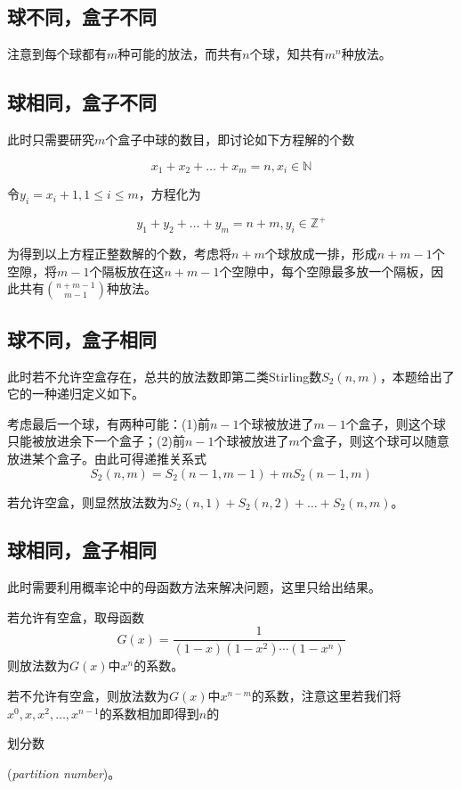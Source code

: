 ﻿\documentclass[11pt]{article}
\renewcommand{\emph}[1]{\begin{kaishu} #1 \end{kaishu}}
\begin{document}
    \subsection{球不同，盒子不同}

    注意到每个球都有$m$种可能的放法，而共有$n$个球，知共有$m^n$种放法。

    \subsection{球相同，盒子不同}

    此时只需要研究$m$个盒子中球的数目，即讨论如下方程解的个数

    \[
        x_1+x_2+\dots +x_m=n, x_i\in \mathbb{N}
    \]

    令$y_i=x_i+1, 1\le i\le m$，方程化为

    \[
        y_1+y_2+\dots +y_m=n+m, y_i\in \mathbb{Z}^{+}
    \]

    为得到以上方程正整数解的个数，考虑将$n+m$个球放成一排，形成$n+m-1$个空隙，将$m-1$个隔板放在这$n+m-1$个空隙中，每个空隙最多放一个隔板，因此共有$n+m-1 \choose m-1$种放法。

    \subsection{球不同，盒子相同}

    此时若不允许空盒存在，总共的放法数即第二类Stirling数$S_2(n, m)$，本题给出了它的一种递归定义如下。

    考虑最后一个球，有两种可能：(1)前$n-1$个球被放进了$m-1$个盒子，则这个球只能被放进余下一个盒子；(2)前$n-1$个球被放进了$m$个盒子，则这个球可以随意放进某个盒子。由此可得递推关系式
    \[
        S_2(n, m)=S_2(n-1, m-1)+mS_2(n-1, m)
    \]

    若允许空盒，则显然放法数为$S_2(n, 1)+S_2(n, 2)+\dots +S_2(n, m)$。

    \subsection{球相同，盒子相同}

    此时需要利用概率论中的母函数方法来解决问题，这里只给出结果。

    若允许有空盒，取母函数
    \[
        G(x)=\frac{1}{(1-x)(1-x^2)\cdots (1-x^n)}
    \]
    则放法数为$G(x)$中$x^n$的系数。

    若不允许有空盒，则放法数为$G(x)$中$x^{n-m}$的系数，注意这里若我们将$x^0,x,x^2, \dots, x^{n-1}$的系数相加即得到$n$的\emph{划分数}({\it partition number})。
\end{document}
